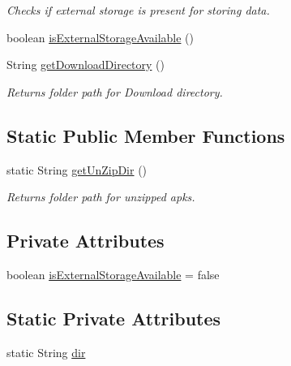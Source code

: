 \begin{DoxyCompactItemize}
\begin{DoxyCompactList}\small\item\em Checks if external storage is present for storing data. \end{DoxyCompactList}\item 
boolean \hyperlink{classorg_1_1buildmlearn_1_1toolkit_1_1ToolkitApplication_a7a355329da403f899f5ae1a769a51027}{is\+External\+Storage\+Available} ()
\item 
String \hyperlink{classorg_1_1buildmlearn_1_1toolkit_1_1ToolkitApplication_ab9cd5e8da6ff1a82eafee60edb626e0d}{get\+Download\+Directory} ()
\begin{DoxyCompactList}\small\item\em Returns folder path for Download directory. \end{DoxyCompactList}\end{DoxyCompactItemize}
\subsection*{Static Public Member Functions}
\begin{DoxyCompactItemize}
\item 
static String \hyperlink{classorg_1_1buildmlearn_1_1toolkit_1_1ToolkitApplication_a3ae1b065b30a587e58b77f625d5e3c5c}{get\+Un\+Zip\+Dir} ()
\begin{DoxyCompactList}\small\item\em Returns folder path for unzipped apks. \end{DoxyCompactList}\end{DoxyCompactItemize}
\subsection*{Private Attributes}
\begin{DoxyCompactItemize}
\item 
boolean \hyperlink{classorg_1_1buildmlearn_1_1toolkit_1_1ToolkitApplication_a44e213cf984150983d557b115fc495e0}{is\+External\+Storage\+Available} = false
\end{DoxyCompactItemize}
\subsection*{Static Private Attributes}
\begin{DoxyCompactItemize}
\item 
static String \hyperlink{classorg_1_1buildmlearn_1_1toolkit_1_1ToolkitApplication_abc6ef4f9a1e6888cb0b5893f3c94c0f1}{dir}
\end{DoxyCompactItemize}


